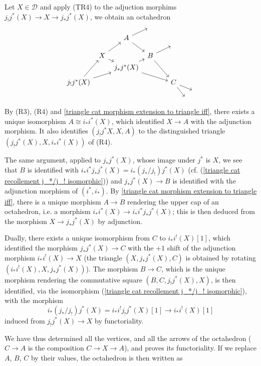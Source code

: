 Let $X\in\mathcal{D}$ and apply (TR4) to the adjuction morphims $j_!j^*(X)\to X\to j_*j^*(X)$, we obtain an octahedron
\begin{equation*}
\begin{tikzcd}[row sep=2pt,column sep=4pt]
&&&{}&\\
&&A\ar[ru]\ar[rdd]&&\\
&&&{}&{}&{}\\
&X\ar[rd]\ar[ruu]&&B\ar[rru]\ar[rrddd]\\
&&j_*j^*(X)\ar[ru]\ar[rrrdd]&&\\
&&&&\\
j_!j^*(X)\ar[ruuu]\ar[rruu]&&&&&C\ar[rdd]\ar[rrd]\\
&&&&&&&{}\\
&&&&&&{}&
\end{tikzcd}
\end{equation*}
By (R3), (R4) and \cref{triangle cat morphism extension to triangle iff}, there exists a unique isomorphism $A\cong i_*i^*(X)$, which identified $X\to A$ with the adjunction morphism. It also identifies $(j_!j^*X,X,A)$ to the distinguished triangle $(j_!j^*(X),X,i_*i^*(X))$ of (R4).\par
The same argument, applied to $j_*j^*(X)$, whose image under $j^*$ is $X$, we see that $B$ is identified with $i_*i^*j_*j^*(X)=i_*(j_*/j_!)j^*(X)$ (cf. (\ref{triangle cat recollement j_*/j_! isomorphic})) and $j_*j^*(X)\to B$ is identified with the adjunction morphism of $(i^*,i_*)$. By \cref{triangle cat morphism extension to triangle iff}, there is a unique morphism $A\to B$ rendering the upper cap of an octahedron, i.e. a morphism $i_*i^*(X)\to i_*i^*j_*j^*(X)$; this is then deduced from the morphism $X\to j_*j^*(X)$ by adjunction.\par
Dually, there exists a unique isomorphism from $C$ to $i_*i^!(X)[1]$, which identified the morphism $j_*j^*(X)\to C$ with the $+1$ shift of the adjunction morphism $i_*i^!(X)\to X$ (the triangle $(X,j_*j^*(X),C)$ is obtained by rotating $(i_*i^!(X),X,j_*j^*(X))$). The morphism $B\to C$, which is the unique morphism rendering the commutative square $(B,C,j_!j^*(X),X)$, is then identified, via the isomorphism (\ref{triangle cat recollement j_*/j_! isomorphic}), with the morphism
\[i_*(j_*/j_!)j^*(X)=i_*i^!j_!j^*(X)[1]\to i_*i^!(X)[1]\]
induced from $j_!j^*(X)\to X$ by functoriality.\par
We have thus determined all the vertices, and all the arrows of the octahedron ($C\to A$ is the composition $C\to X\to A$), and proves its functoriality. If we replace $A$, $B$, $C$ by their values, the octahedron is then written as 
